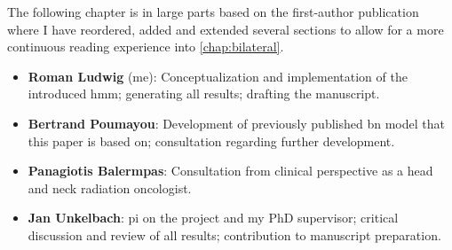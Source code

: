 \begin{tcolorbox}[title=\faIcon{users} Contributions, parbox=false]
    The following chapter is in large parts based on the first-author publication \textbf{} \cite{ludwig_hidden_2021} where I have reordered, added and extended several sections to allow for a more continuous reading experience into \cref{chap:bilateral}.

    \begin{itemize}[leftmargin=5.5mm]
        \item[\faIcon{user}] \textbf{Roman Ludwig} (me): Conceptualization and implementation of the introduced \gls{hmm}; generating all results; drafting the manuscript.
        \item[\faIcon{user}] \textbf{Bertrand Poumayou}: Development of previously published \gls{bn} model \cite{pouymayou_bayesian_2019} that this paper is based on; consultation regarding further development.
        \item[\faIcon{user}] \textbf{Panagiotis Balermpas}: Consultation from clinical perspective as a head and neck radiation oncologist.
        \item[\faIcon{user}] \textbf{Jan Unkelbach}: \Gls{pi} on the project and my PhD supervisor; critical discussion and review of all results; contribution to manuscript preparation.
    \end{itemize}
\end{tcolorbox}
